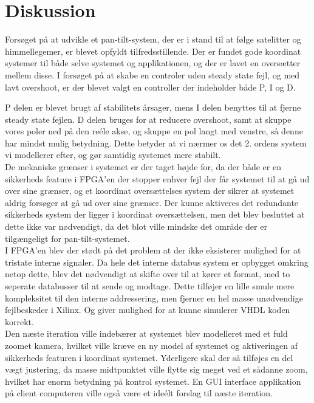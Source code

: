 \section{Diskussion}
Forsøget på at udvikle et pan-tilt-system, der er i stand til at følge satelitter og himmellegemer, er blevet opfyldt tilfredsstillende. Der er fundet gode koordinat systemer til både selve systemet og applikationen, og der er lavet en oversætter mellem disse. I forsøget på at skabe en controler uden steady state fejl, og med lavt overshoot, er der blevet valgt en controller der indeholder både P, I og D.

P delen er blevet brugt af stabilitets årsager, mens I delen benyttes til at fjerne steady state fejlen. D delen bruges for at reducere overshoot, samt at skuppe vores poler ned på den reéle akse, og skuppe en pol langt med venstre, så denne har mindst mulig betydning. Dette betyder at vi nærmer os det 2. ordens system vi modellerer efter, og gør samtidig systemet mere stabilt.
\\
De mekaniske grænser i systemet er der taget højde for, da der både er en sikkerheds feature i FPGA'en der stopper enhver fejl der får systemet til at gå ud over sine grænser, og et koordinat oversættelses system der sikrer at systemet aldrig forsøger at gå ud over sine grænser. Der kunne aktiveres det redundante sikkerheds system der ligger i koordinat oversættelsen, men det blev besluttet at dette ikke var nødvendigt, da det blot ville mindske det område der er tilgængeligt for pan-tilt-systemet.
\\
I FPGA'en blev der stødt på det problem at der ikke eksisterer mulighed for at tristate interne signaler. Da hele det interne databus system er opbygget omkring netop dette, blev det nødvendigt at skifte over til at kører et format, med to seperate databusser til at sende og modtage. Dette tilføjer en lille smule mere kompleksitet til den interne addressering, men fjerner en hel masse unødvendige fejlbeskeder i Xilinx. Og giver mulighed for at kunne simulerer VHDL koden korrekt.
\\
Den næste iteration ville indebærer at systemet blev modelleret med et fuld zoomet kamera, hvilket ville kræve en ny model af systemet og aktiveringen af sikkerheds featuren i koordinat systemet. Yderligere skal der så tilføjes en del vægt justering, da masse midtpunktet ville flytte sig meget ved et sådanne zoom, hvilket har enorm betydning på kontrol systemet. En GUI interface applikation på client computeren ville også være et ideélt forslag til næste iteration.